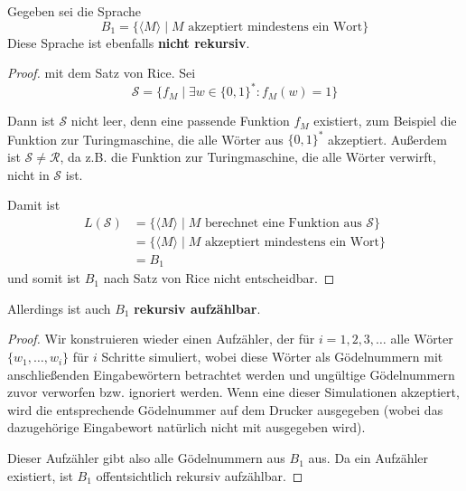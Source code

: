 Gegeben sei die Sprache
\[
	B_1 = \{ \langle M \rangle \mid M \text{ akzeptiert mindestens ein Wort} \}
\]
Diese Sprache ist ebenfalls \textbf{nicht rekursiv}.

\begin{proof} mit dem Satz von Rice.
Sei
\[
\mathcal{S} = \{f_M \mid \exists w \in \{0, 1\}^* : f_M(w) = 1\}
\]

Dann ist $\mathcal{S}$ nicht leer, denn eine passende Funktion $f_M$ existiert,
zum Beispiel die Funktion zur Turingmaschine, die alle Wörter aus $\{0, 1\}^*$
akzeptiert. Außerdem ist $\mathcal{S} \neq \mathcal{R}$, da z.B. die Funktion
zur Turingmaschine, die alle Wörter verwirft, nicht in $\mathcal{S}$ ist.

Damit ist
\begin{align*}
	L(\mathcal{S}) &= \{\langle M \rangle \mid M
		\text{ berechnet eine Funktion aus }\mathcal{S}\} \\
	&= \{\langle M \rangle \mid M \text{ akzeptiert mindestens ein Wort}\} \\
	&= B_1
\end{align*}
und somit ist $B_1$ nach Satz von Rice nicht entscheidbar.
\end{proof}

Allerdings ist auch $B_1$ \textbf{rekursiv aufzählbar}.

\begin{proof}
Wir konstruieren wieder einen Aufzähler, der für $i = 1, 2, 3, \dots$
alle Wörter $\{w_1, \dots, w_i\}$ für $i$ Schritte simuliert, wobei diese Wörter
als Gödelnummern mit anschließenden Eingabewörtern betrachtet werden und
ungültige Gödelnummern zuvor verworfen bzw. ignoriert werden. Wenn eine dieser
Simulationen akzeptiert, wird die entsprechende Gödelnummer auf dem Drucker
ausgegeben (wobei das dazugehörige Eingabewort natürlich nicht mit ausgegeben
wird).

Dieser Aufzähler gibt also alle Gödelnummern aus $B_1$ aus. Da ein Aufzähler
existiert, ist $B_1$ offentsichtlich rekursiv aufzählbar.
\end{proof}
